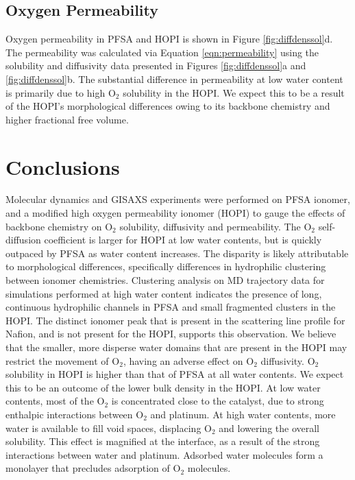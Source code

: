 \documentclass[journal=jacsat,manuscript=article]{achemso}
\begin{document}
\subsection{Oxygen Permeability}
Oxygen permeability in PFSA and HOPI is shown in Figure \ref{fig:diffdenssol}d. The permeability was calculated via Equation \ref{eqn:permeability} using the solubility and diffusivity data presented in Figures \ref{fig:diffdenssol}a and \ref{fig:diffdenssol}b. The substantial difference in permeability at low water content is primarily due to high O$_2$ solubility in the HOPI. We expect this to be a result of the HOPI's morphological differences owing to its backbone chemistry and higher fractional free volume. 

\section{Conclusions}
Molecular dynamics and GISAXS experiments were performed on PFSA ionomer, and a modified high oxygen permeability ionomer (HOPI) to gauge the effects of backbone chemistry on O$_2$ solubility, diffusivity and permeability. The O$_2$ self-diffusion coefficient is larger for HOPI at low water contents, but is quickly outpaced by PFSA as water content increases. The disparity is likely attributable to morphological differences, specifically differences in hydrophilic clustering between ionomer chemistries. Clustering analysis on MD trajectory data for simulations performed at high water content indicates the presence of long, continuous hydrophilic channels in PFSA and small fragmented clusters in the HOPI. The distinct ionomer peak that is present in the scattering line profile for Nafion, and is not present for the HOPI, supports this observation. We believe that the smaller, more disperse water domains that are present in the HOPI may restrict the movement of O$_2$, having an adverse effect on O$_2$ diffusivity. O$_2$ solubility in HOPI is higher than that of PFSA at all water contents. We expect this to be an outcome of the lower bulk density in the HOPI. At low water contents, most of the O$_2$ is concentrated close to the catalyst, due to strong enthalpic interactions between O$_2$ and platinum. At high water contents, more water is available to fill void spaces, displacing O$_2$ and lowering the overall solubility. This effect is magnified at the interface, as a result of the strong interactions between water and platinum. Adsorbed water molecules form a monolayer that precludes adsorption of O$_2$ molecules. 
\end{document}
